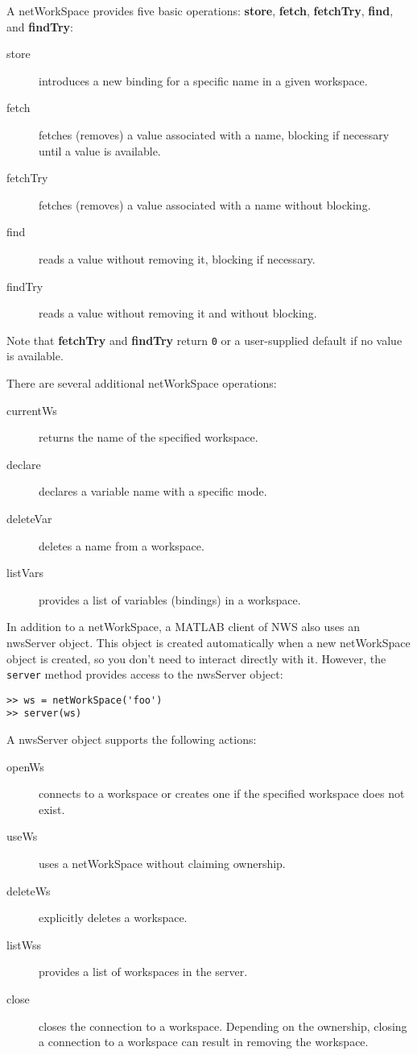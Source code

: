 A netWorkSpace provides five basic operations:
\textbf{store}, \textbf{fetch}, \textbf{fetchTry}, \textbf{find}, and
\textbf{findTry}:
\begin{description}
\item[store] introduces a new binding for a specific name in a given workspace.
\item[fetch] fetches (removes) a value associated with a name, blocking
if necessary until a value is available.
\item[fetchTry] fetches (removes) a value associated with a name without
blocking.
\item[find] reads a value without removing it, blocking if necessary.
\item[findTry] reads a value without removing it and without blocking.
\end{description}

Note that \textbf{fetchTry} and \textbf{findTry} return \texttt{0} or
a user-supplied default if no value is available.

There are several additional netWorkSpace operations:
\begin{description}
\item[currentWs] returns the name of the specified workspace.
\item[declare] declares a variable name with a specific mode.
\item[deleteVar] deletes a name from a workspace.
\item[listVars] provides a list of variables (bindings) in a workspace.
\end{description}

In addition to a netWorkSpace, a MATLAB client of NWS also uses an
nwsServer object. This object is created automatically when a new
netWorkSpace object is created, so you don't need to interact directly
with it. However, the \texttt{server} method provides access to the
nwsServer object:

\begin{verbatim}
>> ws = netWorkSpace('foo')
>> server(ws)
\end{verbatim}

A nwsServer object supports the following actions:

\begin{description}
\item[openWs] connects to a workspace or creates one if the specified
workspace does not exist. 
\item[useWs] uses a netWorkSpace without claiming ownership.
\item[deleteWs] explicitly deletes a workspace.
\item[listWss] provides a list of workspaces in the server.  
\item[close] closes the connection to a workspace. Depending on the
ownership, closing a connection to a workspace can result in removing
the workspace. 
\end{description}

